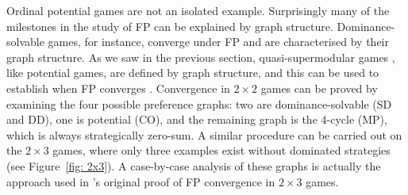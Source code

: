 \documentclass[preprint,authoryear]{elsarticle}
\begin{document}


Ordinal potential games are not an isolated example. Surprisingly many of the milestones in the study of FP can be explained by graph structure. %
Dominance-solvable games, for instance, converge under FP and are characterised by their graph structure. As we saw in the previous section, quasi-supermodular games \citep{milgrom_rationalizability_1990}, like potential games, are defined by graph structure, and this can be used to establish when FP converges \citep{berger_two_2007}. Convergence in $2\times 2$ games can be proved by examining the four possible preference graphs: two are dominance-solvable (SD and DD), one is potential (CO), and the remaining graph is the 4-cycle (MP), which is always strategically zero-sum. A similar procedure can be carried out on the $2\times 3$ games, where only three examples exist without dominated strategies (see Figure~\ref{fig: 2x3}). A case-by-case analysis of these graphs is actually the approach used in \citeauthor{monderer_fictitious_1997}'s original proof of FP convergence in $2\times 3$ games.
\end{document}
